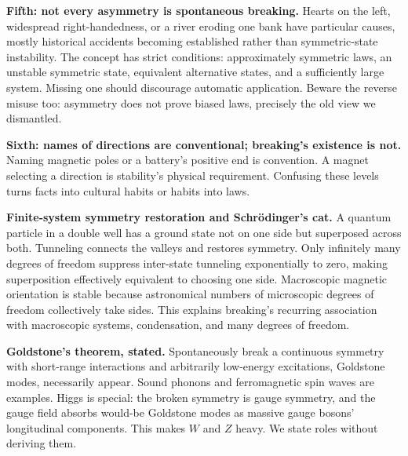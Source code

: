 \begin{mainline}
\textbf{Fifth: not every asymmetry is spontaneous breaking.} Hearts on the left, widespread right-handedness, or a river eroding one bank have particular causes, mostly historical accidents becoming established rather than symmetric-state instability. The concept has strict conditions: approximately symmetric laws, an unstable symmetric state, equivalent alternative states, and a sufficiently large system. Missing one should discourage automatic application. Beware the reverse misuse too: asymmetry does not prove biased laws, precisely the old view we dismantled.

\textbf{Sixth: names of directions are conventional; breaking's existence is not.} Naming magnetic poles or a battery's positive end is convention. A magnet selecting a direction is stability's physical requirement. Confusing these levels turns facts into cultural habits or habits into laws.
\end{mainline}

\begin{challenge}
\textbf{Finite-system symmetry restoration and Schr\"odinger's cat.} A quantum particle in a double well has a ground state not on one side but superposed across both. Tunneling connects the valleys and restores symmetry. Only infinitely many degrees of freedom suppress inter-state tunneling exponentially to zero, making superposition effectively equivalent to choosing one side. Macroscopic magnetic orientation is stable because astronomical numbers of microscopic degrees of freedom collectively take sides. This explains breaking's recurring association with macroscopic systems, condensation, and many degrees of freedom.

\textbf{Goldstone's theorem, stated.} Spontaneously break a continuous symmetry with short-range interactions and arbitrarily low-energy excitations, Goldstone modes, necessarily appear. Sound phonons and ferromagnetic spin waves are examples. Higgs is special: the broken symmetry is gauge symmetry, and the gauge field absorbs would-be Goldstone modes as massive gauge bosons' longitudinal components. This makes \(W\) and \(Z\) heavy. We state roles without deriving them.
\end{challenge}


